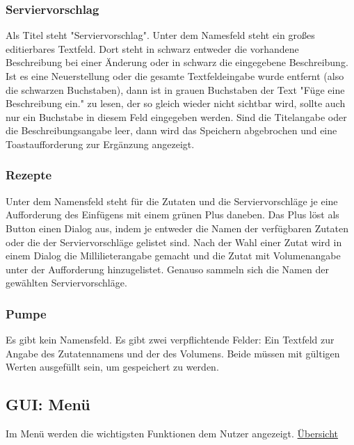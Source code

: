 {\subsubsection{Serviervorschlag}

Als Titel steht "Serviervorschlag". Unter dem Namesfeld steht ein großes editierbares Textfeld. Dort steht in schwarz entweder die vorhandene Beschreibung bei einer Änderung oder in schwarz die eingegebene Beschreibung. Ist es eine Neuerstellung oder die gesamte Textfeldeingabe wurde entfernt (also die schwarzen Buchstaben), dann ist in grauen Buchstaben der Text "Füge eine Beschreibung ein." zu lesen, der so gleich wieder nicht sichtbar wird, sollte auch nur ein Buchstabe in diesem Feld eingegeben werden. Sind die Titelangabe oder die Beschreibungsangabe leer, dann wird das Speichern abgebrochen und eine Toastaufforderung zur Ergänzung angezeigt.

\subsubsection{Rezepte}

Unter dem Namensfeld steht für die Zutaten und die Serviervorschläge je eine Aufforderung des Einfügens mit einem grünen Plus daneben. Das Plus löst als Button einen Dialog aus, indem je entweder die Namen der verfügbaren Zutaten oder die der Serviervorschläge gelistet sind. Nach der Wahl einer Zutat wird in einem Dialog die Millilieterangabe gemacht und die Zutat mit Volumenangabe unter der Aufforderung hinzugelistet. Genauso sammeln sich die Namen der gewählten Serviervorschläge.

\subsubsection{Pumpe}

Es gibt kein Namensfeld. Es gibt zwei verpflichtende Felder: Ein Textfeld zur Angabe des Zutatennamens und der des Volumens. Beide müssen mit gültigen Werten ausgefüllt sein, um gespeichert zu werden.


\subsection{GUI: Menü}

Im Menü werden die wichtigsten Funktionen dem Nutzer angezeigt.
\hyperref[table:menu]{Übersicht}

}
